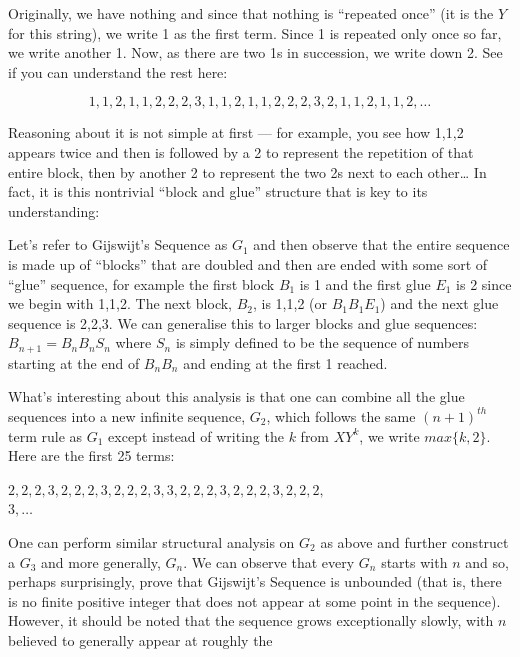\documentclass[11pt,a4paper]{report}
\begin{document}
	\begin{multicols}{2}
		
		Originally, we have nothing and since that nothing is “repeated once” (it is the \(Y\) for this string), we write 1 as the first term. Since 1 is repeated only once so far, we write another 1. Now, as there are two 1s in succession, we write down 2. See if you can understand the rest here:\par
		
		\[1, 1, 2, 1, 1, 2, 2, 2, 3, 1, 1, 2, 1, 1, 2, 2, 2, 3, 2, 1, 1, 2, 1, 1, 2, \ldots\]
		
		Reasoning about it is not simple at first --- for example, you see how 1,1,2 appears twice and then is followed by a 2 to represent the repetition of that entire block, then by another 2 to represent the two 2s next to each other… In fact, it is this nontrivial “block and glue” structure that is key to its understanding:\par
		Let’s refer to Gijswijt’s Sequence as \(G_1\) and then observe that the entire sequence is made up of “blocks” that are doubled and then are ended with some sort of “glue” sequence, for example the first block \(B_1\) is 1 and the first glue \(E_1\) is 2 since we begin with 1,1,2. The next block, \(B_2\), is 1,1,2 (or \(B_1B_1E_1\)) and the next glue sequence is 2,2,3. We can generalise this to larger blocks and glue sequences: \(B_{n+1} = B_nB_nS_n\) where \(S_n\) is simply defined to be the sequence of numbers starting at the end of \(B_nB_n\) and ending at the first 1 reached.\par
		What’s interesting about this analysis is that one can combine all the glue sequences into a new infinite sequence, \(G_2\), which follows the same \((n+1)^{th}\) term rule as \(G_1\) except instead of writing the \(k\) from \(XY^k\), we write \(max\{k, 2\}\). Here are the first 25 terms:\par
		
		\(2, 2, 2, 3, 2, 2, 2, 3, 2, 2, 2, 3, 3, 2, 2, 2, 3, 2, 2, 2, 3, 2, 2, 2,\)\\\( 3, \ldots\)
		
		One can perform similar structural analysis on \(G_2\) as above and further construct a \(G_3\) and more generally, \(G_n\). We can observe that every \(G_n\) starts with \(n\) and so, perhaps surprisingly, prove that Gijswijt’s Sequence is unbounded (that is, there is no finite positive integer that does not appear at some point in the sequence). However, it should be noted that the sequence grows exceptionally slowly, with \(n\) believed to generally appear at roughly the\par
		

\end{multicols}
\end{document}
